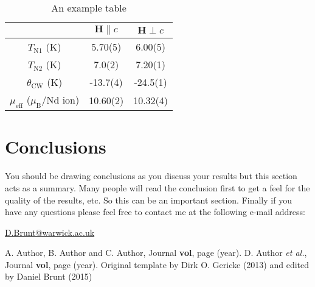 \documentclass[a4paper,12pt, onecolumn, notitlepage]{article}
\begin{document}
\begin{table}[b]
\begin{tabular}{ c c c }
\hline 
 & $\mathbf{H} \parallel c$ & $\mathbf{H} \perp c$ \\ 
\hline 
$T_{\mathrm{N1}}$ (K) & 5.70(5) &  6.00(5) \\ 
$T_{\mathrm{N2}}$ (K) & 7.0(2) & 7.20(1) \\  
$\theta_{\mathrm{CW}}$ (K) & -13.7(4) & -24.5(1) \\  
$\mu_{\mathrm{eff}}$ ($\mu_{\mathrm{B}}$/Nd ion) & 10.60(2) & 10.32(4)  \\ 
\hline 
\end{tabular}
\caption{An example table}
\label{tab: tab_1}
\end{table} 


\section{Conclusions}
You should be drawing conclusions as you discuss your results but this section acts as a summary. Many people will read the conclusion first to get a feel for the quality of the results, etc. So this can be an important section. Finally if you have any questions please feel free to contact me at the following e-mail address:

\begin{center}
\url{D.Brunt@warwick.ac.uk}
\end{center}



\small{
\begin{thebibliography}{99}

\setlength{\itemsep}{-2mm}

 A. Author, B. Author and C. Author,
                  Journal {\bf vol}, page (year).
 D. Author {\em et al.},
                  Journal {\bf vol}, page (year).
 Original template by Dirk O. Gericke (2013) and edited by Daniel Brunt (2015)

\end{thebibliography}
}
\end{document}
